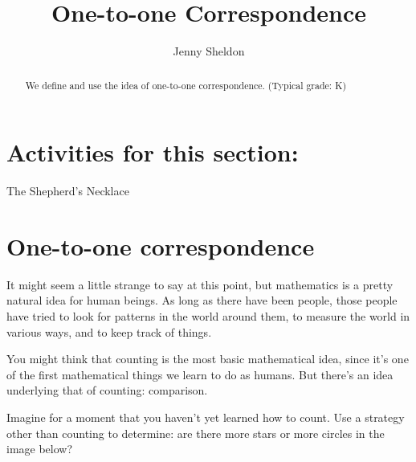 \documentclass{ximera}
\title{One-to-one Correspondence}
\author{Jenny Sheldon}
\begin{document}
\begin{abstract}
We define and use the idea of one-to-one correspondence. (Typical grade: K)
\end{abstract}
\maketitle

\section{Activities for this section:} The Shepherd's Necklace


\section{One-to-one correspondence}


It might seem a little strange to say at this point, but mathematics is a pretty natural idea for 
human beings. As long as there have been people, those people have tried to look for patterns in the world 
around them, to measure the world in various ways, and to keep track of things.

You might think that counting is the most basic mathematical idea, since it's one of the first mathematical 
things we learn to do as humans. But there's an idea underlying that of counting: comparison.

\begin{question}
Imagine for a moment that you haven't yet learned how to count. Use a strategy other than counting to determine: are there  more stars or more circles in the image below?

\begin{center}
\end{center}

\begin{multipleChoice}
\end{multipleChoice}
\end{question}
\end{document}
